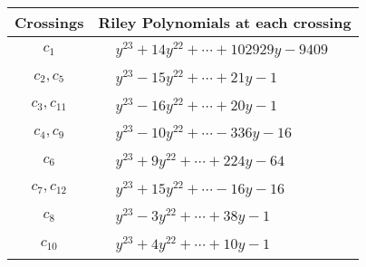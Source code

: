 \documentclass[1p]{elsarticle_modified}
\theoremstyle{definition}
\begin{document}
\begin{tabular}{m{50pt}|m{274pt}}
Crossings & \hspace{64pt}Riley Polynomials at each crossing \\
\hline $$\begin{aligned}c_{1}\end{aligned}$$&$\begin{aligned}
&y^{23}+14 y^{22}+\cdots+102929 y-9409
\end{aligned}$\\
\hline $$\begin{aligned}c_{2},c_{5}\end{aligned}$$&$\begin{aligned}
&y^{23}-15 y^{22}+\cdots+21 y-1
\end{aligned}$\\
\hline $$\begin{aligned}c_{3},c_{11}\end{aligned}$$&$\begin{aligned}
&y^{23}-16 y^{22}+\cdots+20 y-1
\end{aligned}$\\
\hline $$\begin{aligned}c_{4},c_{9}\end{aligned}$$&$\begin{aligned}
&y^{23}-10 y^{22}+\cdots-336 y-16
\end{aligned}$\\
\hline $$\begin{aligned}c_{6}\end{aligned}$$&$\begin{aligned}
&y^{23}+9 y^{22}+\cdots+224 y-64
\end{aligned}$\\
\hline $$\begin{aligned}c_{7},c_{12}\end{aligned}$$&$\begin{aligned}
&y^{23}+15 y^{22}+\cdots-16 y-16
\end{aligned}$\\
\hline $$\begin{aligned}c_{8}\end{aligned}$$&$\begin{aligned}
&y^{23}-3 y^{22}+\cdots+38 y-1
\end{aligned}$\\
\hline $$\begin{aligned}c_{10}\end{aligned}$$&$\begin{aligned}
&y^{23}+4 y^{22}+\cdots+10 y-1
\end{aligned}$\\
\hline
\end{tabular}\\~\\
\end{document}
